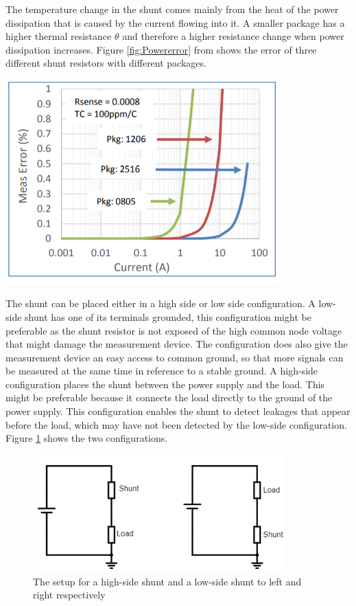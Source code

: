 The temperature change in the shunt comes mainly from the heat of the power dissipation that is caused by the current flowing into it. A smaller package has a higher thermal resistance $\theta$ and therefore a higher resistance change when power dissipation increases. Figure \ref{fig:Powererror} from \cite{Intersil} shows the error of three different shunt resistors with different packages. 

\begin{minipage}[t]{0.8\textwidth}
\centering
    \includegraphics[width=0.8\textwidth]{Images/Powererror.PNG}\\
    \captionsetup{justification=centering}
    \label{fig:Powererror}
\end{minipage}


The shunt can be placed either in a high side or low side configuration. A low-side shunt has one of its terminals grounded, this configuration might be preferable as the shunt resistor is not exposed of the high common node voltage that might damage the measurement device. The configuration does also give the measurement device an easy access to common ground, so that more signals can be measured at the same time in reference to a stable ground. A high-side configuration places the shunt between the power supply and the load. This might be preferable because it connects the load directly to the ground of the power supply. This configuration enables the shunt to detect leakages that appear before the load, which may have not been detected by the low-side configuration. Figure \ref{fig:shunt} shows the two configurations. \hfill \break


\begin{figure}[h]
\centering
\includegraphics[height=4.5cm]{Project_Report/Images/shunt.PNG}
\caption{The setup for a high-side shunt and a low-side shunt to left and right respectively}
\label{fig:shunt}
\end{figure}





